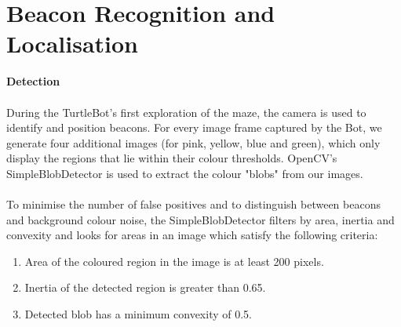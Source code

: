 \documentclass[titlepage,12pt,a4paper]{article}
\begin{document}
\pagebreak


\section*{Beacon Recognition and Localisation}

\large{\textbf{Detection}} \\
\normalsize
\\
During the TurtleBot's first exploration of the maze, the camera is used to identify and position beacons. For every image frame captured by the Bot, we generate four additional images (for pink, yellow, blue and green), which only display the regions that lie within their colour thresholds. OpenCV's SimpleBlobDetector is used to extract the colour "blobs" from our images.\\
\\
To minimise the number of false positives and to distinguish between beacons and background colour noise, the SimpleBlobDetector filters by area, inertia and convexity and looks for areas in an image which satisfy the following criteria:

	\begin{enumerate}
		\item Area of the coloured region in the image is at least 200 pixels.
		\item Inertia of the detected region is greater than 0.65.
		\item Detected blob has a minimum convexity of 0.5.\\
	\end{enumerate}
\end{document}
